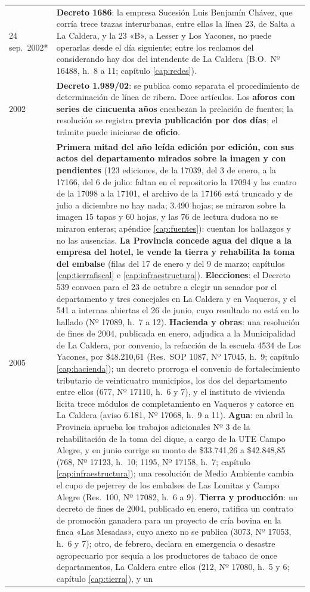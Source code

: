 \begin{longtable}{@{}p{2.7cm}p{10.3cm}@{}}
24 sep.\ 2002* & \textbf{Decreto 1686}: la empresa Sucesión Luis Benjamín Chávez, que corría trece trazas interurbanas, entre ellas la línea 23, de Salta a La Caldera, y la 23 «B», a Lesser y Los Yacones, no puede operarlas desde el día siguiente; entre los reclamos del considerando hay dos del intendente de La Caldera (B.O.\ Nº 16488, h.\ 8 a 11; capítulo \ref{cap:redes}). \\
2002 & \textbf{Decreto 1.989/02}: se publica como separata el procedimiento de determinación de línea de ribera. Doce artículos. Los \textbf{aforos con series de cincuenta años} encabezan la prelación de fuentes; la resolución se registra \textbf{previa publicación por dos días}; el trámite puede iniciarse \textbf{de oficio}. \\
2005 & \textbf{Primera mitad del año leída edición por edición, con sus actos del departamento mirados sobre la imagen y con pendientes} (123 ediciones, de la 17039, del 3 de enero, a la 17166, del 6 de julio: faltan en el repositorio la 17094 y las cuatro de la 17098 a la 17101, el archivo de la 17166 está truncado y de julio a diciembre no hay nada; 3.490 hojas; se miraron sobre la imagen 15 tapas y 60 hojas, y las 76 de lectura dudosa no se miraron enteras; apéndice \ref{cap:fuentes}): cuentan los hallazgos y no las ausencias. \textbf{La Provincia concede agua del dique a la empresa del hotel, le vende la tierra y rehabilita la toma del embalse} (filas del 17 de enero y del 9 de marzo; capítulos \ref{cap:tierrafiscal} e \ref{cap:infraestructura}). \textbf{Elecciones}: el Decreto 539 convoca para el 23 de octubre a elegir un senador por el departamento y tres concejales en La Caldera y en Vaqueros, y el 541 a internas abiertas el 26 de junio, cuyo resultado no está en lo hallado (Nº 17089, h.\ 7 a 12). \textbf{Hacienda y obras}: una resolución de fines de 2004, publicada en enero, adjudica a la Municipalidad de La Caldera, por convenio, la refacción de la escuela 4534 de Los Yacones, por \$48.210,61 (Res.\ SOP 1087, Nº 17045, h.\ 9; capítulo \ref{cap:hacienda}); un decreto prorroga el convenio de fortalecimiento tributario de veinticuatro municipios, los dos del departamento entre ellos (677, Nº 17110, h.\ 6 y 7), y el instituto de vivienda licita trece módulos de completamiento en Vaqueros y catorce en La Caldera (aviso 6.181, Nº 17068, h.\ 9 a 11). \textbf{Agua}: en abril la Provincia aprueba los trabajos adicionales Nº 3 de la rehabilitación de la toma del dique, a cargo de la UTE Campo Alegre, y en junio corrige su monto de \$33.741,26 a \$42.848,85 (768, Nº 17123, h.\ 10; 1195, Nº 17158, h.\ 7; capítulo \ref{cap:infraestructura}); una resolución de Medio Ambiente cambia el cupo de pejerrey de los embalses de Las Lomitas y Campo Alegre (Res.\ 100, Nº 17082, h.\ 6 a 9). \textbf{Tierra y producción}: un decreto de fines de 2004, publicado en enero, ratifica un contrato de promoción ganadera para un proyecto de cría bovina en la finca «Las Mesadas», cuyo anexo no se publica (3073, Nº 17053, h.\ 6 y 7); otro, de febrero, declara en emergencia o desastre agropecuario por sequía a los productores de tabaco de once departamentos, La Caldera entre ellos (212, Nº 17080, h.\ 5 y 6; capítulo \ref{cap:tierra}), y un 
\end{longtable}
